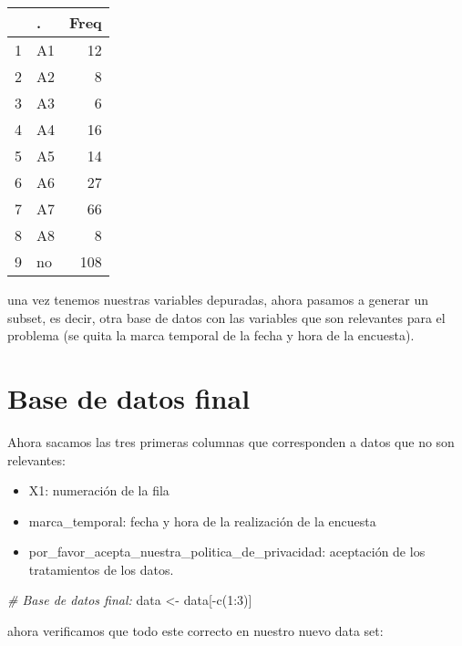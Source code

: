 \documentclass[
]{article}
\newenvironment{Shaded}{\begin{snugshade}}{\end{snugshade}}
\newcommand{\CommentTok}[1]{\textcolor[rgb]{0.56,0.35,0.01}{\textit{#1}}}
\newcommand{\DecValTok}[1]{\textcolor[rgb]{0.00,0.00,0.81}{#1}}
\newcommand{\FunctionTok}[1]{\textcolor[rgb]{0.00,0.00,0.00}{#1}}
\newcommand{\NormalTok}[1]{#1}
\newcommand{\OtherTok}[1]{\textcolor[rgb]{0.56,0.35,0.01}{#1}}
\newcommand{\SpecialCharTok}[1]{\textcolor[rgb]{0.00,0.00,0.00}{#1}}
\begin{document}
\begin{table}[ht]
\centering
\begin{tabular}{rlr}
  \hline
 & . & Freq \\ 
  \hline
1 & A1 &  12 \\ 
  2 & A2 &   8 \\ 
  3 & A3 &   6 \\ 
  4 & A4 &  16 \\ 
  5 & A5 &  14 \\ 
  6 & A6 &  27 \\ 
  7 & A7 &  66 \\ 
  8 & A8 &   8 \\ 
  9 & no & 108 \\ 
   \hline
\end{tabular}
\end{table}

una vez tenemos nuestras variables depuradas, ahora pasamos a generar un
subset, es decir, otra base de datos con las variables que son
relevantes para el problema (se quita la marca temporal de la fecha y
hora de la encuesta).

\hypertarget{base-de-datos-final}{%
\section{Base de datos final}\label{base-de-datos-final}}

Ahora sacamos las tres primeras columnas que corresponden a datos que no
son relevantes:

\begin{itemize}
\item
  X1: numeración de la fila
\item
  marca\_temporal: fecha y hora de la realización de la encuesta
\item
  por\_favor\_acepta\_nuestra\_politica\_de\_privacidad: aceptación de
  los tratamientos de los datos.
\end{itemize}

\begin{Shaded}
\begin{Highlighting}[]
\CommentTok{\# Base de datos final:}
\NormalTok{data }\OtherTok{\textless{}{-}}\NormalTok{ data[}\SpecialCharTok{{-}}\FunctionTok{c}\NormalTok{(}\DecValTok{1}\SpecialCharTok{:}\DecValTok{3}\NormalTok{)]}
\end{Highlighting}
\end{Shaded}

ahora verificamos que todo este correcto en nuestro nuevo data set:
\end{document}
